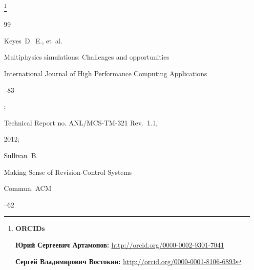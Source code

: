 \thanks{{\bf ORCIDs}



{\bf Юрий Сергеевич Артамонов:}     \url{http://orcid.org/0000-0002-9301-7041}



{\bf Сергей Владимирович Востокин:} \url{http://orcid.org/0000-0001-8106-6893}



}





\RusRef



\begin{thebibliography}{99}




\by Keyes~D.~E., et~al.

\paper   Multiphysics simulations: Challenges and opportunities


\jour International Journal of High Performance Computing Applications 



--83 

;



Technical Report no. ANL/MCS-TM-321 Rev.~1.1,


2012;









\by Sullivan~B.

\paper Making Sense of Revision-Control Systems


\jour Commun. ACM




--62







\end{thebibliography}
